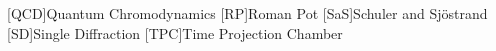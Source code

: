 \begin{acronym}[BRAHMS]
	[QCD]{Quantum Chromodynamics}
	[RP]{Roman Pot}
	[SaS]{Schuler and Sj{\"o}strand}
	[SD]{Single Diffraction}
	[TPC]{Time Projection Chamber}
\end{acronym}